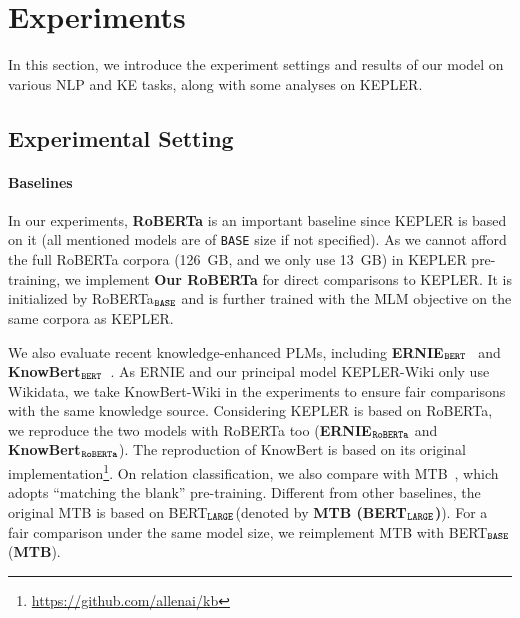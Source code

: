 \newcommand\ROBERTABASE{RoBERTa$_{\small \texttt{BASE}}$\xspace}
\newcommand\BERTBASE{BERT$_{\small \texttt{BASE}}$\xspace}
\newcommand\BERTLARGE{BERT$_{\small \texttt{LARGE}}$\xspace}
\newcommand\RERNIE{ERNIE$_{\small \texttt{RoBERTa}}$\xspace}
\newcommand\RKNOWBERT{KnowBert$_{\small \texttt{RoBERTa}}$\xspace}
\section{Experiments}
\label{sec:exp}

In this section, we introduce the experiment settings and results of our model on various NLP and KE tasks, along with some analyses on KEPLER.

\subsection{Experimental Setting}
\label{sec:expsetting}


\paragraph{Baselines} In our experiments, \textbf{RoBERTa} is an important baseline since KEPLER is based on it (all mentioned models are of \texttt{BASE} size if not specified). 
As we cannot afford the full RoBERTa corpora (126~GB, and we only use 13~GB) in KEPLER pre-training, we implement \textbf{Our RoBERTa} for direct comparisons to KEPLER. It is initialized by \ROBERTABASE and is further trained with the MLM objective on the same corpora as KEPLER.

We also evaluate recent knowledge-enhanced PLMs, including \textbf{ERNIE$_{\small \texttt{BERT}}$}~\citep{zhang-etal-2019-ernie} and \textbf{KnowBert$_{\small \texttt{BERT}}$}~\citep{peters-etal-2019-knowledge}. 
As ERNIE and our principal model KEPLER-Wiki only use Wikidata, we take KnowBert-Wiki in the experiments to ensure fair comparisons with the same knowledge source. Considering KEPLER is based on RoBERTa, we reproduce the two models with RoBERTa too (\textbf{\RERNIE} and \textbf{\RKNOWBERT}). The reproduction of KnowBert is based on its original implementation\footnote{\url{https://github.com/allenai/kb}}. 
On relation classification, we also compare with MTB~\citep{baldini-soares-etal-2019-matching}, which adopts ``matching the blank'' pre-training. Different from other baselines, the original MTB is based on \BERTLARGE (denoted by \textbf{MTB (\BERTLARGE)}). For a fair comparison under the same model size, we reimplement MTB with \BERTBASE (\textbf{MTB}).

